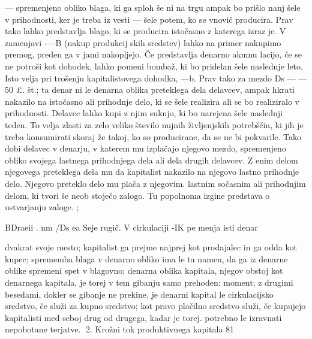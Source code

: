 \documentclass[kapital_02.tex]{subfiles}
\begin{document}
 \KPED — \KPEB spremenjeno obliko blaga, ki ga sploh še ni na trgu ampak bo prišlo nanj šele v prihodnosti, ker je treba iz vesti \KPED — \KPEB šele potem, ko se \KPEB vnovič producira. Prav tako lahko predstavlja \KPED blago, ki se producira istočasno z katerega izraz je. V zamenjavi \KPED-—B (nakup produkcij skih sredstev) lahko na primer nakupimo premog, preden ga v jami nakopljejo. Če predstavlja \KPEd denarno akumu lacijo, če se ne potroši kot dohodek, lahko pomeni bombaž, ki bo pridelan šele naslednje leto. Isto velja pri trošenju kapitalistovega dohodka, \KPEd —b. Prav tako za mezdo Ds — — 50 £. št.; ta denar ni le denarna oblika preteklega dela delavcev, ampak hkrati nakazilo na istočasno ali prihodnje delo, ki se šele realizira ali se bo realiziralo v prihodnosti. Delavec lahko kupi z njim suknjo, ki bo narejena šele naslednji teden. To velja zlasti za zelo veliko število nujnih življenjskih potrebščin, ki jih je treba konsumirati skoraj že takoj, ko so producirane, da se ne bi pokvarile. Tako dobi delavec v denarju, v katerem mu izplačajo njegovo mezdo, spremenjeno obliko svojega lastnega prihodnjega dela ali dela drugih delavcev. Z enim delom njegovega preteklega dela mu da kapitalist nakazilo na njegovo lastno prihodnje delo. Njegovo preteklo delo mu plača z njegovim. lastnim sočasnim ali prihodnjim delom, ki tvori še neob stoječo zalogo. Tu popolnoma izgine predstava o ustvarjanju zaloge. ;

BDraeii . nm /Ds ea Seje rugič. V cirkulaciji -\KPED IK pe menja isti denar

dvakrat svoje mesto; kapitalist ga prejme najprej kot prodajalec in ga odda kot kupec; sprememba blaga v denarno obliko ima le ta namen, da ga iz denarne oblike spremeni spet v blagovno; denarna oblika kapitala, njegov obstoj kot denarnega kapitala, je torej v tem gibanju samo prehoden: moment; z drugimi besedami, dokler se gibanje ne prekine, je denarni kapital le cirkulacijsko sredstvo, če služi za kupno sredstvo; kot pravo plačilno sredstvo služi, če kupujejo kapitalisti med seboj drug od drugega, kadar je torej. potrebno le izravnati nepobotane terjatve. 2. Krožni tok produktivnega kapitala 81
\end{document}
